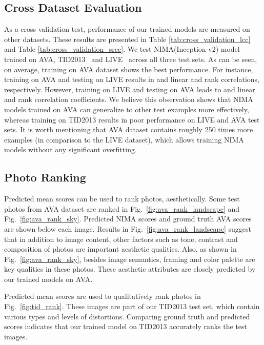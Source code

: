 \documentclass[10pt,twocolumn,twoside]{IEEEtran}
\begin{document}
\subsection{Cross Dataset Evaluation}
\label{sec:cross_dataset_eval}
\vspace{0 mm}

As a cross validation test, performance of our trained models are measured on other datasets. These results are presented in Table \ref{tab:cross_validation_lcc} and Table \ref{tab:cross_validation_srcc}. We test NIMA(Inception-v2) model trained on AVA, TID2013~\cite{ponomarenko2013color}  and LIVE~\cite{ghadiyaram2016massive} across all three test sets. As can be seen, on average, training on AVA dataset shows the best performance. For instance, training on AVA and testing on LIVE results in  and  linear and rank correlations, respectively. However, training on LIVE and testing on AVA leads to  and  linear and rank correlation coefficients. We believe this observation shows that NIMA models trained on AVA can generalize to other test examples more effectively, whereas training on TID2013 results in poor performance on LIVE and AVA test sets. It is worth mentioning that AVA dataset contains roughly 250 times more examples (in comparison to the LIVE dataset), which allows training NIMA models without any significant overfitting.

\subsection{Photo Ranking}
\label{sec:ranking}
\vspace{0 mm}

Predicted mean scores can be used to rank photos, aesthetically. Some test photos from AVA dataset are ranked in Fig.~\ref{fig:ava_rank_landscape} and Fig.~\ref{fig:ava_rank_sky}. Predicted NIMA scores and ground truth AVA scores are shown below each image. Results in Fig.~\ref{fig:ava_rank_landscape} suggest that in addition to image content, other factors such as tone, contrast and composition of photos are important aesthetic qualities. Also, as shown in Fig.~\ref{fig:ava_rank_sky}, besides image semantics, framing and color palette are key qualities in these photos. These aesthetic attributes are closely predicted by our trained models on AVA.

Predicted mean scores are used to qualitatively rank photos in Fig.~\ref{fig:tid_rank}. These images are part of our TID2013 test set, which contain various types and levels of distortions. Comparing ground truth and predicted scores indicates that our trained model on TID2013 accurately ranks the test images.
\end{document}
